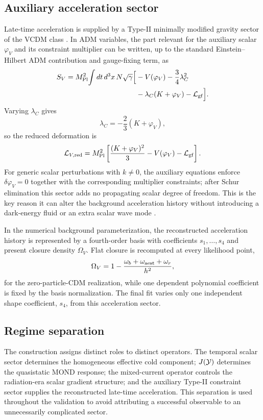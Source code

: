 \subsection{Auxiliary acceleration sector}
Late-time acceleration is supplied by a Type-II minimally modified gravity sector of the VCDM class \cite{DeFeliceMukohyamaPookkillath2021,DeFeliceMaedaMukohyamaPookkillath2022,GanzMartensMukohyamaNamba2023,AkarsuEtAl2024VCDM}. In ADM variables, the part relevant for the auxiliary scalar $\varphi_V$ and its constraint multiplier can be written, up to the standard Einstein--Hilbert ADM contribution and gauge-fixing term, as
\begin{align}
S_V=M_{\rm Pl}^2\!\int dt\,d^3x\,N\sqrt{\gamma}\Big[&-V(\varphi_V)-\frac34\lambda_C^2\nonumber\\
&-\lambda_C(K+\varphi_V)-\mathcal L_{\rm gf}\Big].
\label{eq:vcdm-aux}
\end{align}
Varying $\lambda_C$ gives
\begin{equation}
\lambda_C=-\frac23(K+\varphi_V),
\end{equation}
so the reduced deformation is
\begin{equation}
\mathcal L_{V,\rm red}=M_{\rm Pl}^2\left[\frac{(K+\varphi_V)^2}{3}-V(\varphi_V)-\mathcal L_{\rm gf}\right].
\label{eq:vcdm-red}
\end{equation}
For generic scalar perturbations with $k\neq0$, the auxiliary equations enforce $\delta\varphi_V=0$ together with the corresponding multiplier constraints; after Schur elimination this sector adds no propagating scalar degree of freedom. This is the key reason it can alter the background acceleration history without introducing a dark-energy fluid or an extra scalar wave mode \cite{DeFeliceMaedaMukohyamaPookkillath2022}.

In the numerical background parameterization, the reconstructed acceleration history is represented by a fourth-order basis with coefficients $s_1,\ldots,s_4$ and present closure density $\Omega_{V}$. Flat closure is recomputed at every likelihood point,
\begin{equation}
\Omega_V=1-\frac{\omega_b+\omega_{\rm aest}+\omega_r}{h^2},
\label{eq:vcdm-closure}
\end{equation}
for the zero-particle-CDM realization, while one dependent polynomial coefficient is fixed by the basis normalization. The final fit varies only one independent shape coefficient, $s_4$, from this acceleration sector.

\subsection{Regime separation}
The construction assigns distinct roles to distinct operators. The temporal scalar sector determines the homogeneous effective cold component; $J(\mathcal{Y})$ determines the quasistatic MOND response; the mixed-current operator controls the radiation-era scalar gradient structure; and the auxiliary Type-II constraint sector supplies the reconstructed late-time acceleration. This separation is used throughout the validation to avoid attributing a successful observable to an unnecessarily complicated sector.
